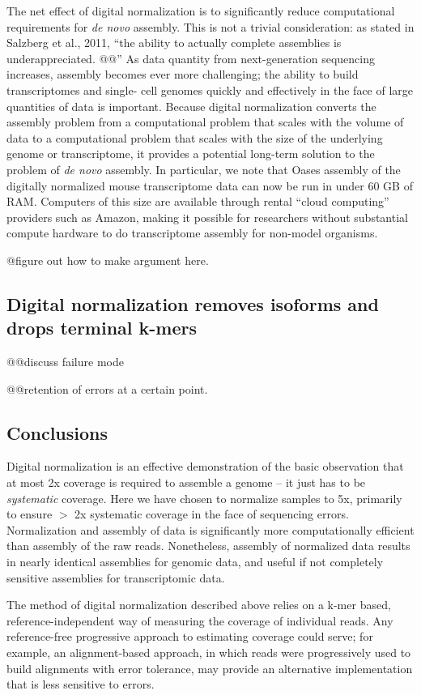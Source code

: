 \documentclass[10pt]{article}
\begin{document}
The net effect of digital normalization is to significantly reduce
computational requirements for {\em de novo} assembly.  This is not a
trivial consideration: as stated in Salzberg et al., 2011, ``the
ability to actually complete assemblies is underappreciated. @@'' As
data quantity from next-generation sequencing increases, assembly
becomes ever more challenging; the ability to build transcriptomes and
single- cell genomes quickly and effectively in the face of large
quantities of data is important.  Because digital normalization
converts the assembly problem from a computational problem that scales
with the volume of data to a computational problem that scales with
the size of the underlying genome or transcriptome, it provides a
potential long-term solution to the problem of {\em de novo} assembly.
In particular, we note that Oases assembly of the digitally normalized
mouse transcriptome data can now be run in under 60 GB of RAM.
Computers of this size are available through rental ``cloud
computing'' providers such as Amazon, making it possible for
researchers without substantial compute hardware to do transcriptome
assembly for non-model organisms.

@figure out how to make argument here.

\subsection*{Digital normalization removes isoforms and drops terminal k-mers}

@@discuss failure mode

@@retention of errors at a certain point.

\subsection*{Conclusions}

Digital normalization is an effective demonstration of the basic
observation that at most 2x coverage is required to assemble a genome
-- it just has to be {\em systematic} coverage.  Here we have chosen
to normalize samples to 5x, primarily to ensure $>$ 2x systematic
coverage in the face of sequencing errors.  Normalization and assembly
of data is significantly more computationally efficient than assembly
of the raw reads.  Nonetheless, assembly of normalized data results in
nearly identical assemblies for genomic data, and useful if not
completely sensitive assemblies for transcriptomic data.

The method of digital normalization described above relies on a k-mer
based, reference-independent way of measuring the coverage of
individual reads.  Any reference-free progressive approach to
estimating coverage could serve; for example, an alignment-based
approach, in which reads were progressively used to build alignments
with error tolerance, may provide an alternative implementation that
is less sensitive to errors.
\end{document}
